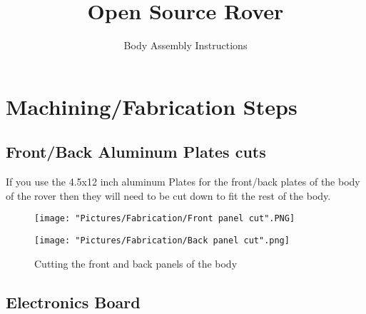 \documentclass[12pt]{article}
\begin{document}
\title{Open Source Rover}
\author{Body Assembly Instructions}

\makeatletter         
\def\@maketitle{
\begin{center}	
	\makebox[\textwidth][c]{ \texttt{[image: "Pictures/Body/Body title".png]}}
	{\Huge \bfseries \sffamily \@title }\\[4ex] 
	{\huge \bfseries \sffamily \@author}\\[4ex] 
	\texttt{[image: "Pictures/Misc/JPL logo".png]}
\end{center}}
\makeatother

\maketitle

\newpage


\tableofcontents

\newpage


\section{Machining/Fabrication Steps}
\subsection{Front/Back Aluminum Plates cuts}

If you use the 4.5x12 inch aluminum Plates for the front/back plates of the body of the rover then they will need to be cut down to fit the rest of the body. 


\begin{figure}[H]
  \centering
  \begin{minipage}[b]{0.45\textwidth}
    \texttt{[image: "Pictures/Fabrication/Front panel cut".PNG]}
  \end{minipage}
  \hfill
  \begin{minipage}[b]{0.45\textwidth}
    \texttt{[image: "Pictures/Fabrication/Back panel cut".png]}
  \end{minipage}
  \caption{Cutting the front and back panels of the body}
  \label{fb panel cut}
\end{figure}

\subsection{Electronics Board}
\end{document}
